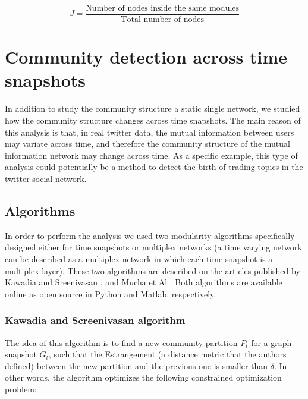 \documentclass[12pt]{article}
\begin{document}
\begin{equation}
J = \frac{\text{Number of nodes inside the same modules}}{\text{Total number of nodes}}
\end{equation}

\section{Community detection across time snapshots}

In addition to study the community structure a static single network, we studied how the community structure changes across time snapshots. The main reason of this analysis is that, in real twitter data,  the mutual information between users may variate across time, and therefore the community structure of the mutual information network may change across time. As
a specific example, this type of analysis could potentially be a method to detect the birth of trading topics in the twitter social network.



\subsection{Algorithms}

In order to perform the analysis we used two modularity algorithms
specifically designed either for time snapshots or multiplex networks (a time varying network
can be described as a multiplex network in which each time snapshot is a multiplex layer).
These two algorithms are described on the articles published by Kawadia and Sreenivasan
\cite{kawadia2012sequential}, and Mucha et Al \cite{Mucha14052010}. Both algorithms are available
online as open source in Python and Matlab, respectively. 

\subsubsection{Kawadia and Screenivasan algorithm}

The idea of this algorithm is to find a new community partition $P_t$ for a graph snapshot $G_t$, such that the Estrangement (a distance
metric that the authors defined) between the new partition and the
previous one is smaller than $\delta$. In other words, the algorithm optimizes
the following constrained optimization problem:
\end{document}
